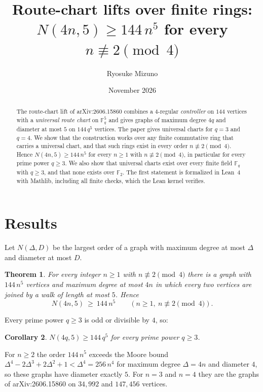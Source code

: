 \documentclass[11pt]{article}
\title{Route-chart lifts over finite rings:\\
$N(4n,5)\ge 144\,n^5$ for every $n\not\equiv 2 \pmod 4$}
\author{Ryosuke Mizuno}
\date{November 2026}
\newtheorem{theorem}{Theorem}
\newtheorem{corollary}[theorem]{Corollary}
\theoremstyle{definition}
\theoremstyle{remark}
\newcommand{\F}{\mathbb{F}}
\begin{document}
\maketitle

\begin{abstract}
The route-chart lift of arXiv:2606.15860 combines a $4$-regular
\emph{controller} on $144$ vertices with a \emph{universal route chart} on
$\F_q^5$ and gives graphs of maximum degree $4q$ and diameter at most $5$
on $144\,q^5$ vertices. The paper gives universal charts for $q=3$ and $q=4$.
We show that the construction works over any finite commutative ring that
carries a universal chart, and that such rings exist in every order
$n\not\equiv 2\pmod 4$. Hence $N(4n,5)\ge 144\,n^5$ for every $n\ge 1$ with
$n\not\equiv 2 \pmod 4$, in particular for every prime power $q\ge 3$. We also
show that universal charts exist over every finite field $\F_q$ with $q\ge 3$,
and that none exists over $\F_2$. The first statement is formalized in Lean~4
with Mathlib, including all finite checks, which the Lean kernel verifies.
\end{abstract}

\section{Results}

Let $N(\Delta,D)$ be the largest order of a graph with maximum degree at most
$\Delta$ and diameter at most $D$.

\begin{theorem}\label{thm:main}
For every integer $n\ge 1$ with $n\not\equiv 2\pmod 4$ there is a graph with
$144\,n^5$ vertices and maximum degree at most $4n$ in which every two
vertices are joined by a walk of length at most $5$. Hence
\[
  N(4n,5)\ \ge\ 144\,n^5 \qquad (n\ge 1,\ n\not\equiv 2 \pmod 4).
\]
\end{theorem}

Every prime power $q\ge 3$ is odd or divisible by $4$, so:

\begin{corollary}\label{cor:pp}
$N(4q,5)\ge 144\,q^5$ for every prime power $q\ge 3$.
\end{corollary}

For $n\ge 2$ the order $144\,n^5$ exceeds the Moore bound
$\Delta^4-2\Delta^3+2\Delta^2+1<\Delta^4=256\,n^4$ for maximum degree
$\Delta=4n$ and diameter $4$, so these graphs have diameter exactly $5$.
For $n=3$ and $n=4$ they are the graphs of arXiv:2606.15860 on $34{,}992$ and
$147{,}456$ vertices.
\end{document}
